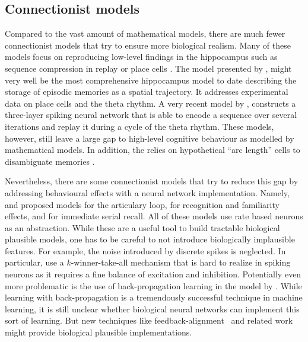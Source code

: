 \subsection{Connectionist models}
Compared to the vast amount of mathematical models, there are much fewer connectionist models that try to ensure more biological realism.
Many of these models focus on reproducing low-level findings in the hippocampus such as sequence compression in replay \parencite{Levy2005} or place cells \parencite{Milford2004}.
The model presented by \textcite{Hasselmo2012}, might very well be the most comprehensive hippocampus model to date describing the storage of episodic memories as a spatial trajectory.
It addresses experimental data on place cells and the theta rhythm.
A very recent model by \textcite{yu2017}, constructs a three-layer spiking neural network that is able to encode a sequence over several iterations and replay it during a cycle of the theta rhythm.
These models, however, still leave a large gap to high-level cognitive behaviour as modelled by mathematical models.
In addition, the \textcite{Hasselmo2012} relies on hypothetical ``arc length'' cells to disambiguate memories \parencite[cp.][]{Robins2014}.

Nevertheless, there are some connectionist models that try to reduce this gap by addressing behavioural effects with a neural network implementation.
Namely, \textcite{Burgess1992} and \textcite{Burgess1996} proposed models for the articulary loop, \textcite{Norman2003} for recognition and familiarity effects, and \textcite{Botvinick2006} for immediate serial recall.
All of these models use rate based neurons as an abstraction.
While these are a useful tool to build tractable biological plausible models, one has to be careful to not introduce biologically implausible features.
For example, the noise introduced by discrete spikes is neglected.
In particular, \textcite{Norman2003} use a $k$-winner-take-all mechanism that is hard to realize in spiking neurons as it requires a fine balance of excitation and inhibition.
Potentially even more problematic is the use of back-propagation learning in the model by \textcite{Botvinick2006}.
While learning with back-propagation is a tremendously successful technique in machine learning, it is still unclear whether biological neural networks can implement this sort of learning.
But new techniques like feedback-alignment~\parencite{lillicrap2016} and related work~\parencite{bengio2015} might provide biological plausible implementations.

